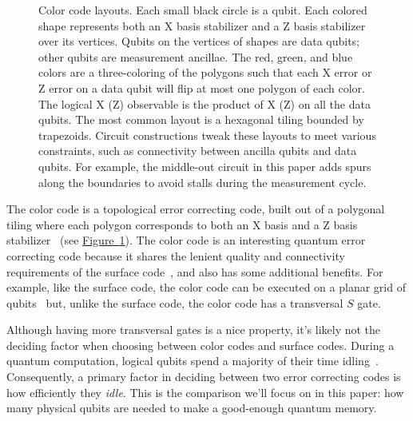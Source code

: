 \documentclass[onecolumn,unpublished,a4paper]{quantumarticle}
\theoremstyle{definition}
\theoremstyle{definition}
\theoremstyle{definition}
\newcommand{\fig}[1]{\hyperref[fig:#1]{Figure~\ref*{fig:#1}}}
\begin{document}
\begin{figure}
    \centering
    \caption{
        Color code layouts.
        Each small black circle is a qubit.
        Each colored shape represents both an X basis stabilizer and a Z basis stabilizer over its vertices.
        Qubits on the vertices of shapes are data qubits; other qubits are measurement ancillae.
        The red, green, and blue colors are a three-coloring of the polygons such that each X error or Z error on a data qubit will flip at most one polygon of each color.
        The logical X (Z) observable is the product of X (Z) on all the data qubits.
        The most common layout is a hexagonal tiling bounded by trapezoids.
        Circuit constructions tweak these layouts to meet various constraints, such as connectivity between ancilla qubits and data qubits.
        For example, the middle-out circuit in this paper adds spurs along the boundaries to avoid stalls during the measurement cycle.
    }
    \label{fig:color-code-layouts}
\end{figure}

The color code is a topological error correcting code, built out of a polygonal tiling where each polygon corresponds to both an X basis and a Z basis stabilizer~\cite{bombin2006colorcode} (see \fig{color-code-layouts}).
The color code is an interesting quantum error correcting code because it shares the lenient quality and connectivity requirements of the surface code~\cite{fowler2012surfacecodereview}, and also has some additional benefits.
For example, like the surface code, the color code can be executed on a planar grid of qubits~\cite{baireuther2019nncolorcode} but, unlike the surface code, the color code has a transversal $S$ gate.

Although having more transversal gates is a nice property, it's likely not the deciding factor when choosing between color codes and surface codes.
During a quantum computation, logical qubits spend a majority of their time idling~\cite{babbush2018,lee2021hypercontraction,gidney2021factor,haner2020improvedeccshot}.
Consequently, a primary factor in deciding between two error correcting codes is how efficiently they \emph{idle}.
This is the comparison we'll focus on in this paper: how many physical qubits are needed to make a good-enough quantum memory.
\end{document}
